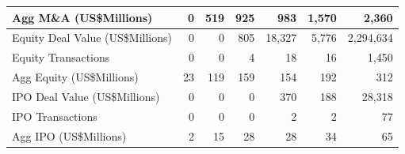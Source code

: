 \documentclass{article}
\begin{document}
\begin{table}[H]
\begin{tabular}{lrrrrrr}
  Agg M\&A (US\$Millions) & 0 & 519 & 925 & 983 & 1,570 & 2,360 \\ 
   \hline
Equity Deal Value (US\$Millions) & 0 & 0 & 805 & 18,327 & 5,776 & 2,294,634 \\ 
  Equity  Transactions & 0 & 0 & 4 & 18 & 16 & 1,450 \\ 
  Agg Equity (US\$Millions) & 23 & 119 & 159 & 154 & 192 & 312 \\ 
   \hline
IPO Deal Value (US\$Millions) & 0 & 0 & 0 & 370 & 188 & 28,318 \\ 
  IPO  Transactions & 0 & 0 & 0 & 2 & 2 & 77 \\ 
  Agg IPO (US\$Millions) & 2 & 15 & 28 & 28 & 34 & 65 \\ 
   \hline
\end{tabular}
\end{table}
\end{document}

